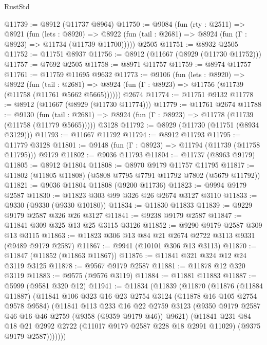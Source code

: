 \begin{lexlean}{RustStd}
\begin{coremodule}
@11739 := @8912 (@11737 @8964)
@11750 := @9084
    (fun (rty : @2511) =>
    @8921
      (fun (lets : @8920) =>
      @8922 (fun (tail : @2681) => @8924 (fun (Γ : @8923) => @11734 (@11739 @11700)))))
    @2505
@11751 := @8932 @2505
@11752 := @11751 @8937
@11756 := @8912 (@11667 (@8929 (@11730 @11752)))
@11757 := @7692 @2505
@11758 := @8971 @11757
@11759 := @8974 @11757
@11761 := @11759 @11695 @9632
@11773 := @9106
    (fun (lets : @8920) =>
    @8922
      (fun (tail : @2681) =>
      @8924 (fun (Γ : @8923) => @11756 (@11739 (@11758 (@11761 @5662 @5665))))))
    @2674
@11774 := @11751 @9132
@11778 := @8912 (@11667 (@8929 (@11730 @11774)))
@11779 := @11761 @2674
@11788 := @9130
    (fun (tail : @2681) => @8924 (fun (Γ : @8923) => @11778 (@11739 (@11758 (@11779 @5665)))))
    @3128
@11792 := @8929 (@11730 (@11751 (@8934 @3129)))
@11793 := @11667 @11792
@11794 := @8912 @11793
@11795 := @11779 @3128
@11801 := @9148 (fun (Γ : @8923) => @11794 (@11739 (@11758 @11795))) @9179
@11802 := @9036 @11793
@11804 := @11737 (@8963 @9179)
@11805 := @8912 @11804
@11808 := @8970 @9179 @11757 @11795
@11817 := @11802 (@11805 @11808) (@5808 @7795 @7791 @11792 @7802 (@5679 @11792))
@11821 := @9036 @11804 @11808 (@9200 @11736)
@11823 := @9994 @9179 @2587
@11830 := @11823 @303 @99 @326 @26 @2674 @3127 @3110
@11833 := @9330 (@9330 (@9330 @10180))
@11834 := @11830 @11833
@11839 := @9229 @9179 @2587 @326 @26 @3127
@11841 := @9238 @9179 @2587
@11847 := @11841 @309 @325 @13 @25 @3115 @3126
@11852 := @9290 @9179 @2587 @309 @13 @3115
@11863 := @11823 @306 @13 @84 @21 @2674 @2722 @3113 @9331 (@9489 @9179 @2587)
@11867 := @9941 (@10101 @306 @13 @3113)
@11870 := @11847 (@11852 (@11863 @11867))
@11876 := @11841 @321 @324 @12 @24 @3119 @3125
@11878 := @9567 @9179 @2587
@11881 := @11878 @12 @320 @3119
@11883 := @9575 (@9576 @3119)
@11884 := @11881 @11883
@11887 := @5999 (@9581 @320 @12)
@11941 := @11834
    (@11839
      (@11870
        (@11876
          (@11884 @11887)
          (@11841
            @106
            @323
            @16
            @23
            @2754
            @3124
            (@11878 @16 @105 @2754 @9578 @9584)
            (@11841
              @113
              @233
              @16
              @22
              @2759
              @3123
              (@9350 @9179 @2587 @46 @16 @46 @2759 (@9358 (@9359 @9179 @46)) @9621)
              (@11841
                @231
                @84
                @18
                @21
                @2992
                @2722
                (@11017 @9179 @2587 @228 @18 @2991 @11029)
                (@9375 @9179 @2587)))))))

\end{coremodule}
\end{lexlean}
